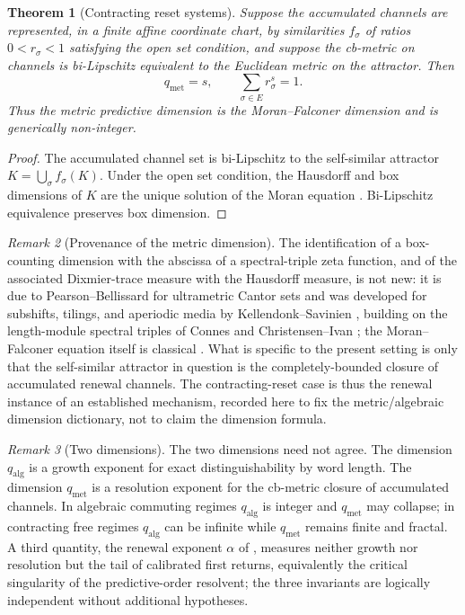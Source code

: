 \documentclass[11pt]{article}
\newtheorem{theorem}{Theorem}[section]
\theoremstyle{definition}
\theoremstyle{remark}
\newtheorem{remark}[theorem]{Remark}
\newcommand{\qalg}{q_{\mathrm{alg}}}
\newcommand{\qmet}{q_{\mathrm{met}}}
\begin{document}
\begin{theorem}[Contracting reset systems]
\label{thm:fractal}
Suppose the accumulated channels are represented, in a finite affine coordinate chart, by similarities $f_\sigma$ of ratios $0<r_\sigma<1$ satisfying the open set condition, and suppose the cb-metric on channels is bi-Lipschitz equivalent to the Euclidean metric on the attractor.  Then
\[
 \qmet=s,
 \qquad
 \sum_{\sigma\in E} r_\sigma^s=1.
\]
Thus the metric predictive dimension is the Moran--Falconer dimension and is generically non-integer.
\end{theorem}

\begin{proof}
The accumulated channel set is bi-Lipschitz to the self-similar attractor $K=\bigcup_\sigma f_\sigma(K)$.  Under the open set condition, the Hausdorff and box dimensions of $K$ are the unique solution of the Moran equation \cite{hutchinson,falconer}.  Bi-Lipschitz equivalence preserves box dimension.
\end{proof}

\begin{remark}[Provenance of the metric dimension]
\label{rem:provenance-qmet}
The identification of a box-counting dimension with the abscissa of a
spectral-triple zeta function, and of the associated Dixmier-trace measure with
the Hausdorff measure, is not new: it is due to Pearson--Bellissard for
ultrametric Cantor sets \cite{pearson-bellissard} and was developed for
subshifts, tilings, and aperiodic media by Kellendonk--Savinien
\cite{kellendonksavinien2012}, building on the length-module spectral triples of
Connes \cite{connes1989} and Christensen--Ivan \cite{christensenivan2006}; the
Moran--Falconer equation itself is classical \cite{hutchinson,falconer,falconertechniques}.
What is specific to the present setting is only that the self-similar attractor
in question is the completely-bounded closure of accumulated renewal channels.
The contracting-reset case is thus the renewal instance of an established
mechanism, recorded here to fix the metric/algebraic dimension dictionary, not to
claim the dimension formula.
\end{remark}

\begin{remark}[Two dimensions]
\label{rem:two-dimensions}
The two dimensions need not agree.  The dimension $\qalg$ is a growth exponent for exact distinguishability by word length.  The dimension $\qmet$ is a resolution exponent for the cb-metric closure of accumulated channels.  In algebraic commuting regimes $\qalg$ is integer and $\qmet$ may collapse; in contracting free regimes $\qalg$ can be infinite while $\qmet$ remains finite and fractal.  A third quantity, the renewal exponent $\alpha$ of , measures neither growth nor resolution but the tail of calibrated first returns, equivalently the critical singularity of the predictive-order resolvent; the three invariants are logically independent without additional hypotheses.
\end{remark}
\end{document}
